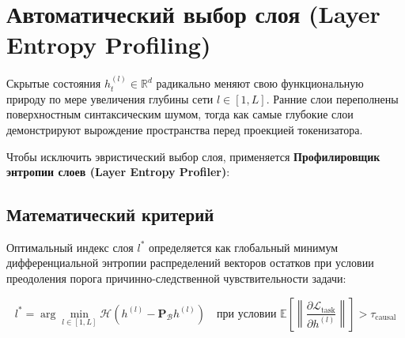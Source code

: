 \documentclass[11pt,a4paper]{article}
\begin{document}
\section{Автоматический выбор слоя (Layer Entropy Profiling)}

Скрытые состояния $h_t^{(l)} \in \mathbb{R}^d$ радикально меняют свою функциональную природу по мере увеличения глубины сети $l \in [1, L]$. Ранние слои переполнены поверхностным синтаксическим шумом, тогда как самые глубокие слои демонстрируют вырождение пространства перед проекцией токенизатора.

Чтобы исключить эвристический выбор слоя, применяется \textbf{Профилировщик энтропии слоев (Layer Entropy Profiler)}:

\begin{figure}[H]
\centering
{}
\end{figure}

\subsection*{Математический критерий}
Оптимальный индекс слоя $l^*$ определяется как глобальный минимум дифференциальной энтропии распределений векторов остатков при условии преодоления порога причинно-следственной чувствительности задачи:

\begin{equation}
l^* = \arg\min_{l \in [1, L]} \mathcal{H}\left( h^{(l)} - \mathbf{P}_{\mathcal{B}} h^{(l)} \right) \quad \text{при условии } \mathbb{E}\left[ \left\| \frac{\partial \mathcal{L}_{\text{task}}}{\partial h^{(l)}} \right\| \right] > \tau_{\text{causal}}
\end{equation}
\end{document}
